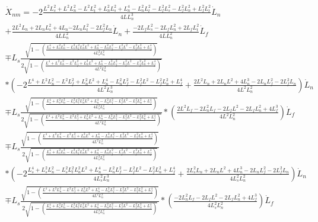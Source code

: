 \documentclass[11pt, landscape]{article}
\begin{document}
\begin{multline*}
  \dot{X}_{nm}  = -2\frac{L^2L_s^2 + L^2L_n^2 - L^2L_t^2 + L_n^2L_s^2 + L_n^4 - L_n^2L_t^2 - L_f^2L_s^2 - L_f^2L_n^2 + L_f^2L_t^2}{4LL_{n}^3}\dot{L}_n\\
  + \frac{2L^2L_n + 2L_nL_s^2 + 4L_n\dot - 2L_nL_t^2 - 2L_f^2L_n}{4LL_{n}^2}\dot{L}_n
  + \frac{-2L_fL_s^2 - 2L_fL_n^2 + 2L_fL_t^2}{4LL_{n}^2}\dot{L}_f\\
  \mp L_s\frac{\sqrt{1-\left(\frac{L_s^4 + L_s^2L_n^2 - L_s^2L_t^2 L_n^2L^2 + L_n^4 - L_n^2L_f^2 - L_f^2L^2 - L_f^2L_n^2 + L_f^4}{4L_{s}^2L_{n}^2}\right)}}{2\sqrt{1 - \left(\frac{L^4 + L^2L_n^2 - L^2L_f^2 + L_n^2L^2 + L_n^4 - L_n^2L_f^2 - L_f^2L^2 - L_f^2L_n^2 + L_f^4}{4L^2L_{n}^2}\right)}}\\
  *\left(-2\frac{L^4 + L^2L_n^2 - L^2L_f^2 + L_n^2L^2 + L_n^4 - L_n^2L_f^2 - L_f^2L^2 - L_f^2L_n^2 + L_f^4}{4L^2L_{n}^3} + \frac{2L^2L_n + 2L_nL^2 + 4L_n^3 - 2L_nL_f^2 - 2L_f^2L_n}{4L^2L_{n}^2}\right)\dot{L}_n\\
  \mp L_s\frac{\sqrt{1-\left(\frac{L_s^4 + L_s^2L_n^2 - L_s^2L_t^2 L_n^2L^2 + L_n^4 - L_n^2L_f^2 - L_f^2L^2 - L_f^2L_n^2 + L_f^4}{4L_{s}^2L_{n}^2}\right)}}{2\sqrt{1 - \left(\frac{L^4 + L^2L_n^2 - L^2L_f^2 + L_n^2L^2 + L_n^4 - L_n^2L_f^2 - L_f^2L^2 - L_f^2L_n^2 + L_f^4}{4L^2L_{n}^2}\right)}}
  *\left(\frac{2L^2L_f - 2L_n^2L_f - 2L_fL^2 - 2L_fL_n^2 + 4L_f^3}{4L^2L_{n}^2}\right)\dot{L}_f\\
  \mp L_s\frac{\sqrt{1 - \left(\frac{L^4 + L^2L_n^2 - L^2L_f^2 + L_n^2L^2 + L_n^4 - L_n^2L_f^2 - L_f^2L^2 - L_f^2L_n^2 + L_f^4}{4L^2L_{n}^2}\right)}}{2\sqrt{1-\left(\frac{L_s^4 + L_s^2L_n^2 - L_s^2L_t^2 L_n^2L^2 + L_n^4 - L_n^2L_f^2 - L_f^2L^2 - L_f^2L_n^2 + L_f^4}{4L_{s}^2L_{n}^2}\right)}}\\
  *\left(-2\frac{L_s^4 + L_s^2L_n^2 - L_s^2L_t^2 L_n^2L^2 + L_n^4 - L_n^2L_f^2 - L_f^2L^2 - L_f^2L_n^2 + L_f^4}{4L_{s}^2L_{n}^3} + \frac{2L_s^2L_n + 2L_nL^2 + 4L_n^3 - 2L_nL_f^2 - 2L_f^2L_n}{4L_{s}^2L_{n}^2}\right)\dot{L}_n\\
  \mp L_s\frac{\sqrt{1 - \left(\frac{L^4 + L^2L_n^2 - L^2L_f^2 + L_n^2L^2 + L_n^4 - L_n^2L_f^2 - L_f^2L^2 - L_f^2L_n^2 + L_f^4}{4L^2L_{n}^2}\right)}}{2\sqrt{1-\left(\frac{L_s^4 + L_s^2L_n^2 - L_s^2L_t^2 L_n^2L^2 + L_n^4 - L_n^2L_f^2 - L_f^2L^2 - L_f^2L_n^2 + L_f^4}{4L_{s}^2L_{n}^2}\right)}}
  *\left(\frac{-2L_n^2L_f - 2L_fL^2 - 2L_fL_n^2 + 4L_f^3}{4L_{s}^2L_{n}^2}\right)\dot{L}_f\\
\end{multline*}
\end{document}
